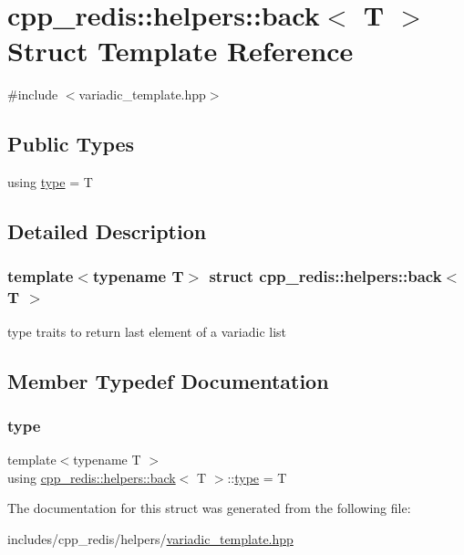 \hypertarget{structcpp__redis_1_1helpers_1_1back_3_01_t_01_4}{}\section{cpp\+\_\+redis\+:\+:helpers\+:\+:back$<$ T $>$ Struct Template Reference}
\label{structcpp__redis_1_1helpers_1_1back_3_01_t_01_4}


{\ttfamily \#include $<$variadic\+\_\+template.\+hpp$>$}

\subsection*{Public Types}
\begin{DoxyCompactItemize}
\item 
using \hyperlink{structcpp__redis_1_1helpers_1_1back_3_01_t_01_4_a87d10cfacd8ca29b083dc5688e77f87c}{type} = T
\end{DoxyCompactItemize}


\subsection{Detailed Description}
\subsubsection*{template$<$typename T$>$\newline
struct cpp\+\_\+redis\+::helpers\+::back$<$ T $>$}

type traits to return last element of a variadic list 

\subsection{Member Typedef Documentation}
\mbox{\label{structcpp__redis_1_1helpers_1_1back_3_01_t_01_4_a87d10cfacd8ca29b083dc5688e77f87c}} 
\subsubsection{\texorpdfstring{type}{type}}
{\footnotesize\ttfamily template$<$typename T $>$ \\
using \hyperlink{structcpp__redis_1_1helpers_1_1back}{cpp\+\_\+redis\+::helpers\+::back}$<$ T $>$\+::\hyperlink{structcpp__redis_1_1helpers_1_1back_3_01_t_01_4_a87d10cfacd8ca29b083dc5688e77f87c}{type} =  T}



The documentation for this struct was generated from the following file\+:\begin{DoxyCompactItemize}
\item 
includes/cpp\+\_\+redis/helpers/\hyperlink{variadic__template_8hpp}{variadic\+\_\+template.\+hpp}\end{DoxyCompactItemize}
